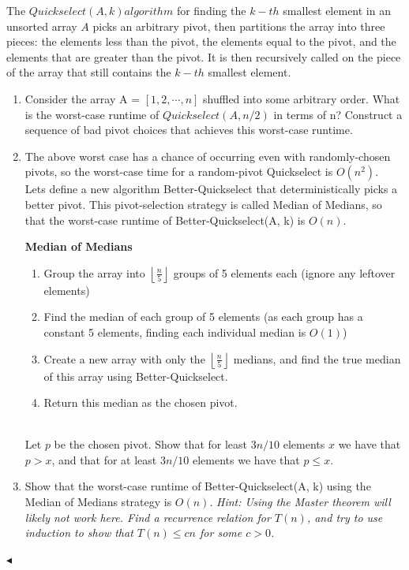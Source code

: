 \documentclass[11pt]{article}
\newenvironment{problem}[2][Problem]{\begin{trivlist}
\item[\hskip \labelsep{\bfseries#1}\hskip\labelsep{\bfseries#2.}]}{\hfill$\blacktriangleleft$\end{trivlist}}
\begin{document}
\begin{problem}{4 (Median of Medians)}
    The $Quickselect(A, k) algorithm$ for finding the $k-th$ smallest element in an unsorted array $A$
    picks an arbitrary pivot, then partitions the array into three pieces: the elements less than the 
    pivot, the elements equal to the pivot, and the elements that are greater than the pivot. 
    It is then recursively called on the piece of the array that still contains the $k-th$ smallest element.
    \begin{enumerate}[label = (\alph*)]
        \item Consider the array A = $\left[1,2,\cdots,n\right]$ shuffled into some arbitrary order. 
        What is the worst-case runtime of $Quickselect(A, n/2)$ in terms of n? Construct a sequence 
        of bad pivot choices that achieves this worst-case runtime.
        \item  The above worst case has a chance of occurring even with randomly-chosen pivots, so the worst-case time for a random-pivot Quickselect is $O(n^2)$.
        \\ Lets define a new algorithm Better-Quickselect that deterministically picks a better pivot. This pivot-selection strategy is called Median of Medians, 
        so that the worst-case runtime of Better-Quickselect(A, k) is $O(n)$.
        \begin{algorithm}
            \caption{\textbf{Median of Medians}}
            \begin{enumerate}
            \item Group the array into  $\left\lfloor \frac{n}{5}\right\rfloor$ groups of 5 elements each (ignore any leftover elements)
            \item Find the median of each group of 5 elements (as each group has a constant 5 elements, finding
            each individual median is $O(1)$)
            \item Create a new array with only the $\left\lfloor \frac{n}{5}\right\rfloor$ medians, and find the true median of this array using Better-Quickselect.
            \item Return this median as the chosen pivot.
            \end{enumerate}
        \end{algorithm}
        \\Let $p$ be the chosen pivot. Show that for least $3n/10$ elements $x$ we have that $p > x$, and that for at least $3n/10$ elements we have that $p \le x$.
        \item Show that the worst-case runtime of Better-Quickselect(A, k) using the Median of Medians strategy is $O(n)$.
        \textit{Hint: Using the Master theorem will likely not work here. Find a recurrence relation for $T(n)$, and try to use induction to show that $T (n) \le cn$ for some $c > 0$.}
    \end{enumerate}
\end{problem}
\end{document}
